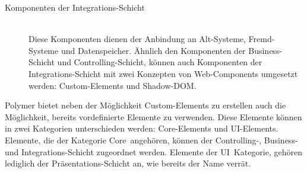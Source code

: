 \begin{description}
\item[Komponenten der Integrations-Schicht] \hfill \\
Diese Komponenten dienen der Anbindung an Alt-Systeme, Fremd-Systeme und Datenspeicher. Ähnlich den Komponenten der Business-Schicht und Controlling-Schicht, können auch Komponenten der Integrations-Schicht mit zwei Konzepten von Web-Components umgesetzt werden: Custom-Elements und Shadow-DOM.

\end{description}

Polymer bietet neben der Möglichkeit Custom-Elements zu erstellen auch die Möglichkeit, bereits vordefinierte Elemente zu verwenden. Diese Elemente können in zwei Kategorien unterschieden werden: Core-Elements und UI-Elements. Elemente, die der Kategorie \glqq Core\grqq\ angehören, können der Controlling-, Business- und Integrations-Schicht zugeordnet werden. Elemente der \glqq UI\grqq\ Kategorie, gehören lediglich der Präsentations-Schicht an, wie bereits der Name verrät.


